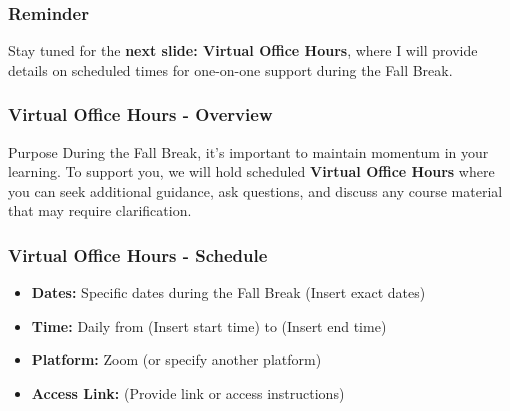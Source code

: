 \documentclass[aspectratio=169]{beamer}
\begin{document}
\begin{frame}[fragile]
    \frametitle{Reminder}
    Stay tuned for the \textbf{next slide: Virtual Office Hours}, where I will provide details on scheduled times for one-on-one support during the Fall Break.
\end{frame}

\begin{frame}[fragile]
    \frametitle{Virtual Office Hours - Overview}
    \begin{block}{Purpose}
        During the Fall Break, it's important to maintain momentum in your learning. To support you, we will hold scheduled \textbf{Virtual Office Hours} where you can seek additional guidance, ask questions, and discuss any course material that may require clarification.
    \end{block}
\end{frame}

\begin{frame}[fragile]
    \frametitle{Virtual Office Hours - Schedule}
    \begin{itemize}
        \item \textbf{Dates:} Specific dates during the Fall Break (Insert exact dates)
        \item \textbf{Time:} Daily from (Insert start time) to (Insert end time)
        \item \textbf{Platform:} Zoom (or specify another platform)
        \item \textbf{Access Link:} (Provide link or access instructions)
    \end{itemize}
\end{frame}
\end{document}
